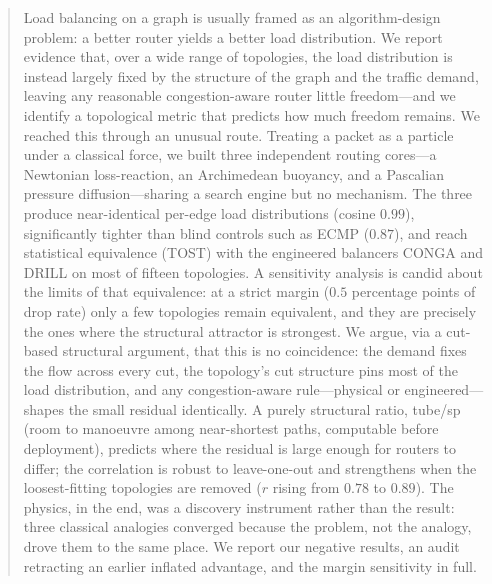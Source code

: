 \begin{abstract}
Load balancing on a graph is usually framed as an algorithm-design problem: a
better router yields a better load distribution. We report evidence that, over
a wide range of topologies, the load distribution is instead largely fixed by
the structure of the graph and the traffic demand, leaving any reasonable
congestion-aware router little freedom---and we identify a topological metric
that predicts how much freedom remains. We reached this through an unusual
route. Treating a packet as a particle under a classical force, we built three
independent routing cores---a Newtonian loss-reaction, an Archimedean buoyancy,
and a Pascalian pressure diffusion---sharing a search engine but no mechanism.
The three produce near-identical per-edge load distributions (cosine $0.99$),
significantly tighter than blind controls such as ECMP ($0.87$), and reach
statistical equivalence (TOST) with the engineered balancers CONGA and DRILL on
most of fifteen topologies. A sensitivity analysis is candid about the limits of
that equivalence: at a strict margin ($0.5$ percentage points of drop rate) only
a few topologies remain equivalent, and they are precisely the ones where the
structural attractor is strongest. We argue, via a cut-based structural
argument, that this is no coincidence: the demand fixes the flow across every
cut, the topology's cut structure pins most of the load distribution, and any
congestion-aware rule---physical or engineered---shapes the small residual
identically. A purely structural ratio, tube/sp (room to manoeuvre among
near-shortest paths, computable before deployment), predicts where the residual
is large enough for routers to differ; the correlation is robust to leave-one-out
and strengthens when the loosest-fitting topologies are removed ($r$ rising from
$0.78$ to $0.89$). The physics, in the end, was a discovery instrument rather
than the result: three classical analogies converged because the problem, not
the analogy, drove them to the same place. We report our negative results, an
audit retracting an earlier inflated advantage, and the margin sensitivity in
full.
\end{abstract}
